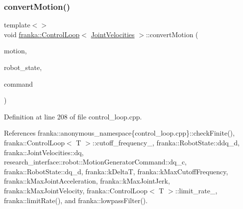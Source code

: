 \mbox{\label{classfranka_1_1ControlLoop_a64b502db834f429b6869c09bd1afd2fb}} 
\subsubsection{\texorpdfstring{convert\+Motion()}{convertMotion()}\hspace{0.1cm}{\footnotesize\ttfamily [3/5]}}
{\footnotesize\ttfamily template$<$$>$ \\
void \hyperlink{classfranka_1_1ControlLoop}{franka\+::\+Control\+Loop}$<$ \hyperlink{classfranka_1_1JointVelocities}{Joint\+Velocities} $>$\+::convert\+Motion (\begin{DoxyParamCaption}\item[{const \hyperlink{classfranka_1_1JointVelocities}{Joint\+Velocities} \&}]{motion,  }\item[{const \hyperlink{structfranka_1_1RobotState}{Robot\+State} \&}]{robot\+\_\+state,  }\item[{\hyperlink{structresearch__interface_1_1robot_1_1MotionGeneratorCommand}{research\+\_\+interface\+::robot\+::\+Motion\+Generator\+Command} $\ast$}]{command }\end{DoxyParamCaption})\hspace{0.3cm}{\ttfamily [private]}}



Definition at line 208 of file control\+\_\+loop.\+cpp.



References franka\+::anonymous\+\_\+namespace\{control\+\_\+loop.\+cpp\}\+::check\+Finite(), franka\+::\+Control\+Loop$<$ T $>$\+::cutoff\+\_\+frequency\+\_\+, franka\+::\+Robot\+State\+::ddq\+\_\+d, franka\+::\+Joint\+Velocities\+::dq, research\+\_\+interface\+::robot\+::\+Motion\+Generator\+Command\+::dq\+\_\+c, franka\+::\+Robot\+State\+::dq\+\_\+d, franka\+::k\+DeltaT, franka\+::k\+Max\+Cutoff\+Frequency, franka\+::k\+Max\+Joint\+Acceleration, franka\+::k\+Max\+Joint\+Jerk, franka\+::k\+Max\+Joint\+Velocity, franka\+::\+Control\+Loop$<$ T $>$\+::limit\+\_\+rate\+\_\+, franka\+::limit\+Rate(), and franka\+::lowpass\+Filter().


